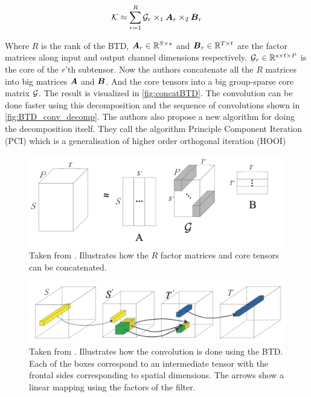 \begin{equation}
    \mathcal{K} \approx \sum_{r=1}^{R} \mathcal{G}_r \times_1 \boldsymbol{A}_r \times_2 \boldsymbol{B}_r
\end{equation}

Where $R$ is the rank of the BTD, $\boldsymbol{A}_r \in \mathbb{R}^{S\times s}$ and $\boldsymbol{B}_r \in \mathbb{R}^{T\times t}$ are the factor matrices along input and output channel dimensions respectively. $\mathcal{G}_r \in \mathbb{R}^{s\times t \times P}$ is the core of the $r$'th subtensor. Now the authors concatenate all the $R$ matrices into big matrices $\boldsymbol{A}$ and $\boldsymbol{B}$. And the core tensors into a big group-sparse core matrix $\mathcal{G}$. The result is visualized in \autoref{fig:concatBTD}. The convolution can be done faster using this decomposition and the sequence of convolutions shown in \autoref{fig:BTD_conv_decomp}. The authors also propose a new algorithm for doing the decomposition itself. They call the algorithm Principle Component Iteration (PCI) which is a generalisation of higher order orthogonal iteration (HOOI)

\begin{figure}
    \centering
    \includegraphics[width=0.8\linewidth]{Pics/03_Previous_work/concatBTD.png}
    \caption{Taken from \cite{Wang2016}. Illustrates how the $R$ factor matrices and core tensors can be concatenated.} 
    \label{fig:concatBTD}
\end{figure}

\begin{figure}
    \centering
    \includegraphics[width=.8\linewidth]{Pics/03_Previous_work/BTD_conv_decomp.png}
    \caption{Taken from \cite{Wang2016}. Illustrates how the convolution is done using the BTD. Each of the boxes correspond to an intermediate tensor with the frontal sides corresponding to spatial dimensions. The arrows show a linear mapping using the factors of the filter.}
    \label{fig:BTD_conv_decomp}
\end{figure}

